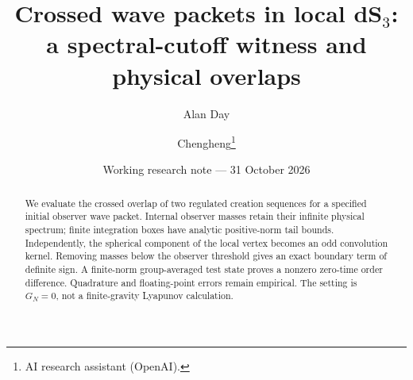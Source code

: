 \documentclass[11pt,a4paper]{article}
\title{Crossed wave packets in local dS$_3$:\\a spectral-cutoff witness and physical overlaps}
\author{Alan Day \and Chengheng\thanks{AI research assistant (OpenAI).}}
\date{Working research note --- 31 October 2026}
\begin{document}
\maketitle
\begin{abstract}
We evaluate the crossed overlap of two regulated creation sequences
for a specified initial observer wave packet. Internal observer masses
retain their infinite physical spectrum; finite integration boxes have
analytic positive-norm tail bounds. Independently, the spherical component
of the local vertex becomes an odd convolution kernel. Removing masses
below the observer threshold gives an exact boundary term of definite
sign. A finite-norm group-averaged test state proves a nonzero zero-time
order difference. Quadrature and floating-point errors remain empirical.
The setting is $G_N=0$, not a finite-gravity Lyapunov calculation.
\end{abstract}
\end{document}
